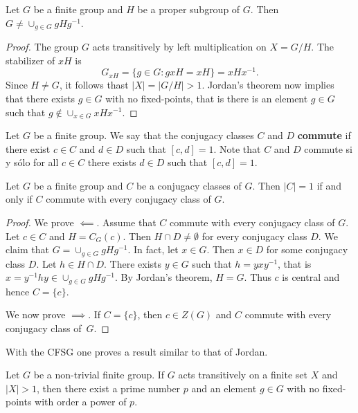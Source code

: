 \begin{corollary}
    Let $G$ be a finite group and $H$ be a proper subgroup of $G$. 
    Then $G\ne\cup_{g\in G}gHg^{-1}$.
\end{corollary}

\begin{proof}
    The group $G$ acts transitively by left multiplication on $X=G/H$. The stabilizer
    of $xH$ is 
    \[
    G_{xH}=\{g\in G:gxH=xH\}=xHx^{-1}.
    \]
    Since $H\ne G$, it follows thast $|X|=|G/H|>1$. Jordan's theorem now implies
    that there exists $g\in G$ with no fixed-points, that is 
    there is an element $g\in G$ such that $g\not\in\cup_{x\in G}xHx^{-1}$. 
\end{proof}

Let $G$ be a finite group. We say that the conjugacy classes $C$ and $D$ 
\textbf{commute} if there exist 
$c\in C$ and $d\in D$ such that $[c,d]=1$. 
Note that $C$ and $D$ commute si y sólo for all $c\in C$ there exists $d\in D$ 
such that $[c,d]=1$. 

\begin{corollary}[Wildon]
    Let $G$ be a finite group and $C$ be a conjugacy classes of $G$. 
    Then $|C|=1$ if and only if $C$ commute 
    with every conjugacy class of $G$.
\end{corollary}
    
\begin{proof}
    We prove $\impliedby$. 
    Assume that $C$ commute with every conjugacy class of $G$. 
    Let $c\in C$ and $H=C_G(c)$. Then $H\cap D\ne\emptyset$ for every conjugacy class
    $D$. We claim that $G=\cup_{g\in G}gHg^{-1}$. In fact, let $x\in G$. Then
    $x\in D$ 
    for some conjugacy class $D$. 
    Let 
    $h\in H\cap D$. There exists $y\in G$ such that $h=yxy^{-1}$, that is
    $x=y^{-1}hy\in \cup_{g\in G}gHg^{-1}$. By Jordan's theorem,  
    $H=G$. Thus $c$ is central and hence $C=\{c\}$. 
    
    We now prove $\implies$. If $C=\{c\}$, then $c\in Z(G)$ and $C$ commute with every 
    conjugacy class of~$G$. 
\end{proof}

With the CFSG one proves a result similar to that of Jordan. 

\begin{theorem}
    Let $G$ be a non-trivial finite group. If $G$ acts transitively
    on a finite set $X$ and $|X|>1$, then
    there exist a prime number $p$ and an element $g\in G$ with no fixed-points
    with order a power of $p$.
\end{theorem}

